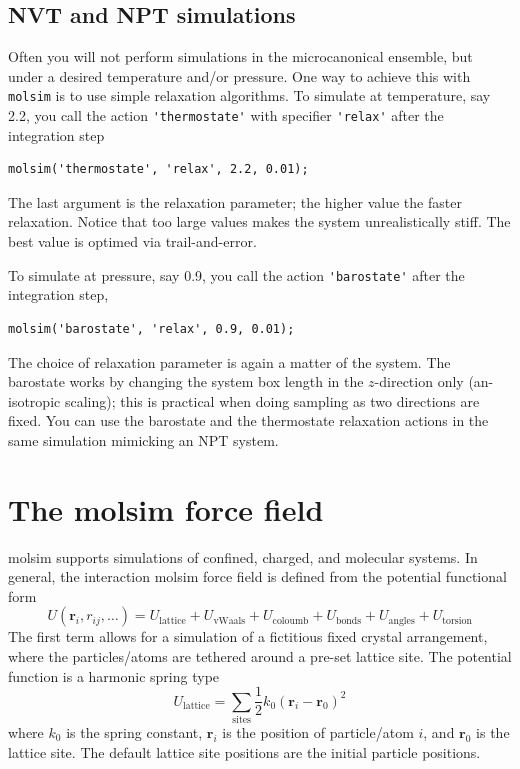\documentclass[11pt]{article}
\begin{document}
\subsection{NVT and NPT simulations}
Often you will not perform simulations in the microcanonical ensemble, but under
a desired temperature and/or pressure. One way to achieve this with
\verb!molsim! is to use simple relaxation algorithms. To simulate at
temperature, say 2.2, you call the action \verb!'thermostate'! with specifier
\verb!'relax'! after the integration step
\begin{verbatim}
molsim('thermostate', 'relax', 2.2, 0.01);
\end{verbatim}
The last argument is the relaxation parameter; the higher value the faster
relaxation. Notice that too large values makes the system unrealistically
stiff. The best value is optimed via trail-and-error.

To simulate at pressure, say 0.9, you call the action \verb!'barostate'! after
the integration step,
\begin{verbatim}
molsim('barostate', 'relax', 0.9, 0.01);
\end{verbatim}
The choice of relaxation parameter is again a matter of the system. The
barostate works by changing the system box length in the $z$-direction only
(an-isotropic scaling); this is practical when doing sampling as two directions
are fixed. You can use the barostate and the thermostate relaxation actions in
the same simulation mimicking an NPT system.


\section{The \textsf{molsim} force field}
\textsf{molsim} supports simulations of confined, charged, and molecular
systems. In general, the interaction \textsf{molsim} force field is defined from
the potential functional form
\begin{equation}
  U(\mathbf{r}_i, r_{ij}, \ldots)
  =  U_\mathrm{lattice} + U_\mathrm{vWaals} + U_{\mathrm{coloumb}} +
  U_\mathrm{bonds} + U_\mathrm{angles} + 
  U_\mathrm{torsion}
\end{equation}
The first term allows for a simulation of a fictitious fixed crystal
arrangement, where the particles/atoms are tethered around a pre-set lattice
site. The potential function is a harmonic spring type
\begin{equation}
  U_\mathrm{lattice} =
  \sum_\mathrm{sites} \frac{1}{2}k_0 (\mathbf{r}_i - \mathbf{r}_0)^2
\end{equation}
where $k_0$ is the spring constant, $\mathbf{r}_i$ is the position of
particle/atom $i$, and $\mathbf{r}_0$ is the lattice site. The default
lattice site positions are the initial particle positions.
\end{document}
